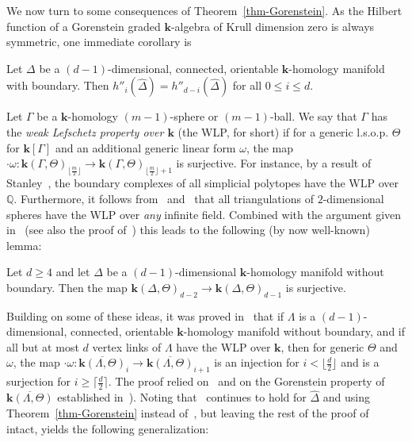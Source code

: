 \documentclass[ALCO,ThmDefs,Unicode,epreuves]{cedram}
\newcommand{\complet}[1]{\hat{#1}}
\newcommand{\field}{\mathbf{k}}
\newcommand{\Q}{{\mathbb Q}}
\begin{document}
We now turn to some consequences of Theorem~\ref{thm-Gorenstein}. As the Hilbert function of a Gorenstein graded $\field$-algebra of Krull dimension zero is always symmetric, one immediate corollary is
\begin{coro} \label{symmetry}
Let $\Delta$ be a $(d-1)$-dimensional, connected, orientable $\field$-homology manifold with boundary. Then 
$h''_i(\complet{\Delta})=h''_{d-i}(\complet{\Delta})$ for all $0\leq i \leq d$.
\end{coro}

Let $\Gamma$ be a $\field$-homology $(m-1)$-sphere or $(m-1)$-ball. We say that $\Gamma$ has the \emph{weak Lefschetz property over $\field$} (the WLP, for short) if for a generic l.s.o.p. $\Theta$ for $\field[\Gamma]$ and an additional generic linear form $\omega$, the map $\cdot \omega: \field(\Gamma,\Theta)_{\lfloor \frac{m}{2}\rfloor} \to \field(\Gamma,\Theta)_{\lfloor \frac{m}{2}\rfloor+1}$ is surjective. For instance, by a result of Stanley~\cite{Stanley-80}, the boundary complexes of all simplicial polytopes have the WLP over $\Q$. Furthermore, it follows from~\cite[Cor.~3.5]{Murai-10:Shifting} and~\cite{Whiteley-90} that all triangulations of $2$-dimensional spheres have the WLP over \emph{any} infinite field. Combined with the argument given in~\cite[Corollary~4.29]{Swartz-09} (see also the proof of~\cite[Theorem~5.2]{Novik-Swartz-09:Socles}) this leads to the following (by now well-known) lemma:

\begin{lemma}
Let $d\geq 4$ and let $\Delta$ be a $(d-1)$-dimensional $\field$-homology manifold without boundary. Then the map $\field(\Delta,\Theta)_{d-2} \to \field(\Delta,\Theta)_{d-1}$ is surjective.
\end{lemma}

Building on some of these ideas, it was proved in~\cite[Theorem~3.2]{Novik-Swartz-09:Gorenstein} that if $\Lambda$ is a $(d-1)$-dimensional, connected, orientable $\field$-homology manifold without boundary, and if all but at most $d$ vertex links of $\Lambda$ have the WLP over $\field$, then for generic $\Theta$ and $\omega$, the map $\cdot \omega: \overline{\field(\Lambda,\Theta)}_i \to \overline{\field(\Lambda,\Theta)}_{i+1}$ is an injection for $i<\lfloor \frac{d}{2}\rfloor$ and is a surjection for $i\geq \lceil \frac{d}{2}\rceil$. The proof relied on~\cite[Theorem~4.26]{Swartz-09} and on the Gorenstein property of $\overline{\field(\Lambda,\Theta)}$ established in~\cite[Theorem~1.4]{Novik-Swartz-09:Gorenstein}). Noting that~\cite[Theorem~4.26]{Swartz-09} continues to hold for $\complet{\Delta}$ and using Theorem~\ref{thm-Gorenstein} instead of~\cite[Theorem~1.4]{Novik-Swartz-09:Gorenstein}, but leaving the rest of the proof of~\cite[Theorem~3.2]{Novik-Swartz-09:Gorenstein} intact, yields the following generalization:
\end{document}
